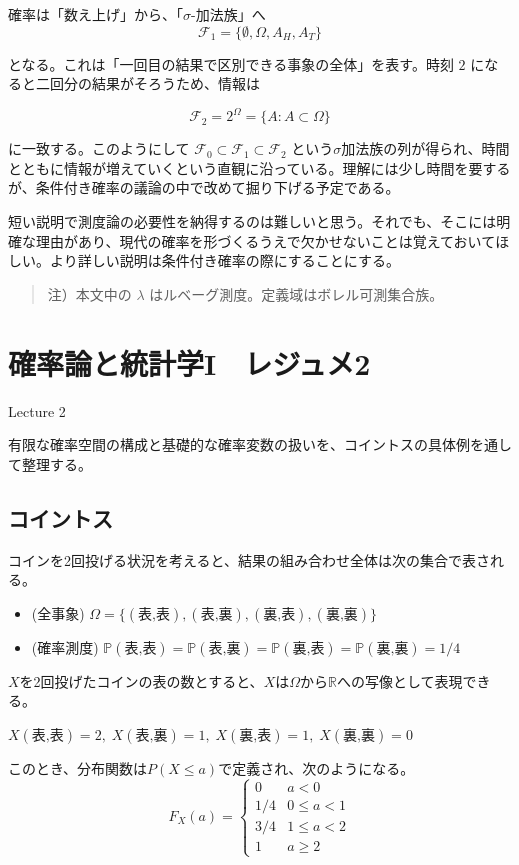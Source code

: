 \documentclass[uplatex,dvipdfmx,11pt,a4paper,openany]{bxjsbook}
\newenvironment{noteblock}{\begin{quote}\color{black!72}\small}{\end{quote}}
\newcommand{\columnheading}[1]{\par\medskip{\large\color{ColumnInk}#1}\par\smallskip}
\begin{document}
\begin{columnbox}{確率は「数え上げ」から、「$\sigma$-加法族」へ}
\[\mathcal F_1=\{\emptyset,\Omega,A_H,A_T\}\]

となる。これは「一回目の結果で区別できる事象の全体」を表す。時刻 $2$ になると二回分の結果がそろうため、情報は

\[\mathcal F_2=2^{\Omega}=\{A: A\subset \Omega\}\]

に一致する。このようにして $ \mathcal F_0\subset \mathcal F_1\subset \mathcal F_2 $ という$\sigma$加法族の列が得られ、時間とともに情報が増えていくという直観に沿っている。理解には少し時間を要するが、条件付き確率の議論の中で改めて掘り下げる予定である。

\columnheading{まとめ}
短い説明で測度論の必要性を納得するのは難しいと思う。それでも、そこには明確な理由があり、現代の確率を形づくるうえで欠かせないことは覚えておいてほしい。より詳しい説明は条件付き確率の際にすることにする。

\begin{noteblock}
注）本文中の $\lambda$ はルベーグ測度。定義域はボレル可測集合族。
\end{noteblock}

\end{columnbox}

\chapter{確率論と統計学I　レジュメ2}
Lecture 2

有限な確率空間の構成と基礎的な確率変数の扱いを、コイントスの具体例を通して整理する。

\section{コイントス}
コインを2回投げる状況を考えると、結果の組み合わせ全体は次の集合で表される。

\begin{itemize}
\item (全事象) $\Omega=\{(\text{表,表}),(\text{表,裏}),(\text{裏,表}),(\text{裏,裏})\}$
\item (確率測度) $\mathbb{P}(\text{表,表})=\mathbb{P}(\text{表,裏})=\mathbb{P}(\text{裏,表})=\mathbb{P}(\text{裏,裏})=1/4$
\end{itemize}

$X$を2回投げたコインの表の数とすると、$X$は$\Omega$から$\mathbb{R}$への写像として表現できる。

$X(\text{表,表})=2,\; X(\text{表,裏})=1,\; X(\text{裏,表})=1,\; X(\text{裏,裏})=0$

このとき、分布関数は$P(X\leq a)$で定義され、次のようになる。
            \[F_X(a)=\begin{cases}
            0 & a < 0\\
            1/4 & 0 \leq  a < 1\\
            3/4 & 1 \leq a < 2\\
            1 & a \geq 2\end{cases}\]
\end{document}
